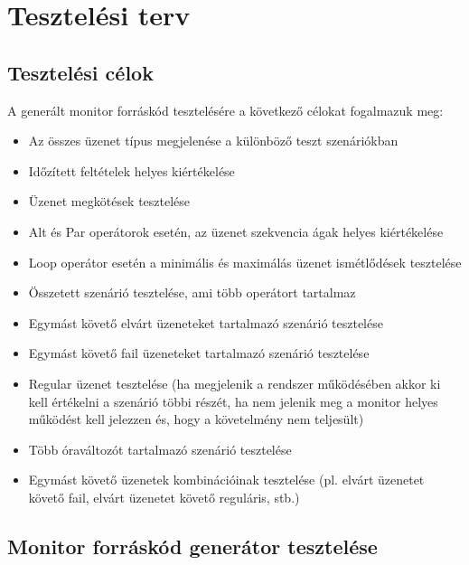 \chapter{Tesztelési terv}

\section{Tesztelési célok}

A generált monitor forráskód tesztelésére a következő célokat fogalmazuk meg:

\begin{itemize}
    \item Az összes üzenet típus megjelenése a különböző teszt szenáriókban
    \item Időzített feltételek helyes kiértékelése
    \item Üzenet megkötések tesztelése
    \item Alt és Par operátorok esetén, az üzenet szekvencia ágak helyes kiértékelése
    \item Loop operátor esetén a minimális és maximálás üzenet ismétlődések tesztelése
    \item Összetett szenárió tesztelése, ami több operátort tartalmaz
    \item Egymást követő elvárt üzeneteket tartalmazó szenárió tesztelése
    \item Egymást követő fail üzeneteket tartalmazó szenárió tesztelése
    \item Regular üzenet tesztelése (ha megjelenik a rendszer működésében akkor ki kell értékelni a szenárió többi részét, ha nem jelenik meg a monitor helyes működést kell jelezzen és, hogy a követelmény nem teljesült)
    \item Több óraváltozót tartalmazó szenárió tesztelése
    \item Egymást követő üzenetek kombinációinak tesztelése (pl. elvárt üzenetet követő fail, elvárt üzenetet követő reguláris, stb.)
\end{itemize}

\clearpage\section{Monitor forráskód generátor tesztelése}

